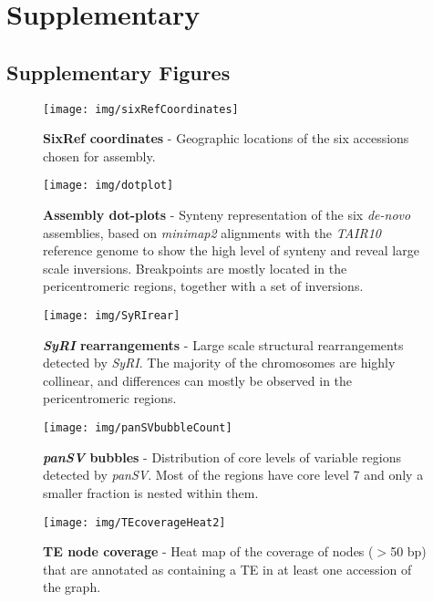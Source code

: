 \chapter{Supplementary}

\section{Supplementary Figures}

\begin{figure}[h!]
	\centering
	\texttt{[image: img/sixRefCoordinates]}
	\caption{\textbf{SixRef coordinates} - Geographic locations of the six accessions chosen for assembly.}
	\label{fig:sixRefCoords}
\end{figure}

\begin{figure}[h!]
	\centering
	\texttt{[image: img/dotplot]}
	\caption{\textbf{Assembly dot-plots} - Synteny representation of the six \textit{de-novo} assemblies, based on \textit{minimap2} alignments with the \textit{TAIR10} reference genome to show the high level of synteny and reveal large scale inversions. Breakpoints are mostly located in the pericentromeric regions, together with a set of inversions.}
	\label{fig:dotplots}
\end{figure}

\begin{figure}[h!]
	\centering
	\texttt{[image: img/SyRIrear]}
	\caption{\textbf{\textit{SyRI} rearrangements} - Large scale structural rearrangements detected by \textit{SyRI}. The majority of the chromosomes are highly collinear, and differences can mostly be observed in the pericentromeric regions.}
	\label{fig:SyRIrear}
\end{figure}

\begin{figure}[h!]
	\centering
	\texttt{[image: img/panSVbubbleCount]}
	\caption{\textbf{\textit{panSV} bubbles} - Distribution of core levels of variable regions detected by \textit{panSV}. Most of the regions have core level 7 and only a smaller fraction is nested within them.}
	\label{fig:panSVbubbleCount}
\end{figure}

\begin{figure}[h!]
	\centering
	\texttt{[image: img/TEcoverageHeat2]}
	\caption{\textbf{TE node coverage} - Heat map of the coverage of nodes ($>$50 bp) that are annotated as containing a TE in at least one accession of the graph.}
	\label{fig:TEcoverageHeat}
\end{figure}

